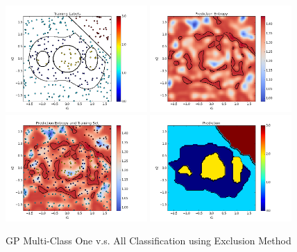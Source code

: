 				\begin{figure}[!htbp]
					\centering
						\includegraphics[width=0.48\textwidth]{Figures/Progress/exclusionOVA/Figure1.png}
						\includegraphics[width=0.48\textwidth]{Figures/Progress/exclusionOVA/Figure2.png}
						\includegraphics[width=0.48\textwidth]{Figures/Progress/exclusionOVA/Figure3.png}
						\includegraphics[width=0.48\textwidth]{Figures/Progress/exclusionOVA/Figure4.png}
					\caption{GP Multi-Class One v.s. All Classification using Exclusion Method}
					\label{ProgressReport:GaussianProcessModels:Figure:exclusionOVA1}
				\end{figure}

